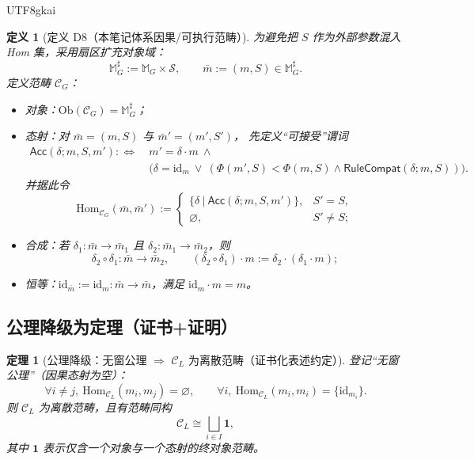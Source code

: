 \documentclass[12pt]{article}
\newtheorem{definition}{定义}[section]
\newtheorem{theorem}{定理}[section]
\newcommand{\KouJing}{\texorpdfstring{表述约定}{表述约定}}
\begin{document}
\begin{CJK*}{UTF8}{gkai}
\begin{definition}[定义 D8（本笔记体系因果/可执行范畴）]
\label{def:tex29-category-cg}
为避免把 $S$ 作为外部参数混入 Hom 集，采用扇区扩充对象域：
\[
  \mathbb{M}_G^{\sharp}:=\mathbb{M}_G\times\mathcal{S},
  \qquad
  \bar{m}:=(m,S)\in\mathbb{M}_G^{\sharp}.
\]
定义范畴 $\mathcal{C}_G$：
\begin{itemize}
  \item 对象：$\mathrm{Ob}(\mathcal{C}_G)=\mathbb{M}_G^{\sharp}$；
  \item 态射：对 $\bar{m}=(m,S)$ 与 $\bar{m}'=(m',S')$，
  先定义“可接受”谓词
  \[
  \begin{aligned}
    \mathsf{Acc}(\delta;m,S,m'):\Longleftrightarrow\
    &m'=\delta\cdot m\ \wedge\\
    &\bigl(\delta=\mathrm{id}_m\ \vee\ (\Phi(m',S)<\Phi(m,S)\wedge \mathsf{RuleCompat}(\delta;m,S))\bigr).
  \end{aligned}
  \]
  并据此令
  \[
    \mathrm{Hom}_{\mathcal{C}_G}(\bar{m},\bar{m}')
    :=
    \begin{cases}
      \bigl\{\delta\ \big|\ \mathsf{Acc}(\delta;m,S,m')\bigr\}, & S'=S,\\[2pt]
      \varnothing, & S'\neq S;
    \end{cases}
  \]
  \item 合成：若 $\delta_1:\bar{m}\to \bar{m}_1$ 且 $\delta_2:\bar{m}_1\to \bar{m}_2$，则
  \[
    \delta_2\circ \delta_1:\bar{m}\to \bar{m}_2,
    \qquad
    (\delta_2\circ\delta_1)\cdot m:=\delta_2\cdot(\delta_1\cdot m);
  \]
  \item 恒等：$\mathrm{id}_{\bar{m}}:=\mathrm{id}_m:\bar{m}\to\bar{m}$，满足 $\mathrm{id}_m\cdot m=m$。
\end{itemize}
\end{definition}

\subsection{公理降级为定理（证书+证明）}
\label{subsec:tex29-causal-category-contrast-axioms}

\begin{theorem}[公理降级：无窗公理 $\Rightarrow$ $\mathcal{C}_L$ 为离散范畴（证书化\KouJing）]
\label{thm:tex29-axL-downgraded-discrete}
登记“无窗公理”（因果态射为空）：
\[
  \forall i\neq j,\ \mathrm{Hom}_{\mathcal{C}_L}(m_i,m_j)=\varnothing,
  \qquad
  \forall i,\ \mathrm{Hom}_{\mathcal{C}_L}(m_i,m_i)=\{\mathrm{id}_{m_i}\}.
\]
则 $\mathcal{C}_L$ 为离散范畴，且有范畴同构
\[
  \mathcal{C}_L\cong \bigsqcup_{i\in I}\mathbf{1},
\]
其中 $\mathbf{1}$ 表示仅含一个对象与一个态射的终对象范畴。
\end{theorem}


\end{CJK*}
\end{document}
